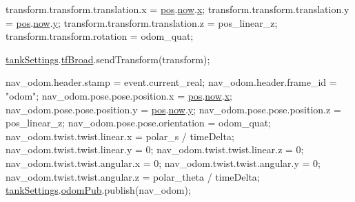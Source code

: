 \begin{DoxyCode}
{    transform.transform.translation.x = \hyperlink{classTankSteering_ae08d9f507d6de01a86f59aa135283abc}{pos}.\hyperlink{structTankSteering_1_1odom_a20be7326384f778c008d55a0d304f0ab}{now}.\hyperlink{structTankSteering_1_1orientation_af121cb548f0f9fcfc8a294654b1ceb85}{x};
    transform.transform.translation.y = \hyperlink{classTankSteering_ae08d9f507d6de01a86f59aa135283abc}{pos}.\hyperlink{structTankSteering_1_1odom_a20be7326384f778c008d55a0d304f0ab}{now}.\hyperlink{structTankSteering_1_1orientation_a6fa34c399e16ffa4c8b8145126c6c9bf}{y};
    transform.transform.translation.z = pos\_linear\_z;
    transform.transform.rotation = odom\_quat;

    \hyperlink{classTankSteering_a6973af1afc00c9b11f32ecc7ad7e8a14}{tankSettings}.\hyperlink{structTankSteering_1_1tankSet_a24fcf593e4c92d8abfd5444e1206807b}{tfBroad}.sendTransform(transform);

    nav\_odom.header.stamp = \textcolor{keyword}{event}.current\_real;
    nav\_odom.header.frame\_id = \textcolor{stringliteral}{"odom"};
    nav\_odom.pose.pose.position.x = \hyperlink{classTankSteering_ae08d9f507d6de01a86f59aa135283abc}{pos}.\hyperlink{structTankSteering_1_1odom_a20be7326384f778c008d55a0d304f0ab}{now}.\hyperlink{structTankSteering_1_1orientation_af121cb548f0f9fcfc8a294654b1ceb85}{x};
    nav\_odom.pose.pose.position.y = \hyperlink{classTankSteering_ae08d9f507d6de01a86f59aa135283abc}{pos}.\hyperlink{structTankSteering_1_1odom_a20be7326384f778c008d55a0d304f0ab}{now}.\hyperlink{structTankSteering_1_1orientation_a6fa34c399e16ffa4c8b8145126c6c9bf}{y};
    nav\_odom.pose.pose.position.z = pos\_linear\_z;
    nav\_odom.pose.pose.orientation = odom\_quat;
    nav\_odom.twist.twist.linear.x = polar\_s / timeDelta;
    nav\_odom.twist.twist.linear.y = 0;
    nav\_odom.twist.twist.linear.z = 0;
    nav\_odom.twist.twist.angular.x = 0;
    nav\_odom.twist.twist.angular.y = 0;
    nav\_odom.twist.twist.angular.z = polar\_theta / timeDelta;
    \hyperlink{classTankSteering_a6973af1afc00c9b11f32ecc7ad7e8a14}{tankSettings}.\hyperlink{structTankSteering_1_1tankSet_a49304224faeac566fc964cbc98135499}{odomPub}.publish(nav\_odom);

}
\end{DoxyCode}
